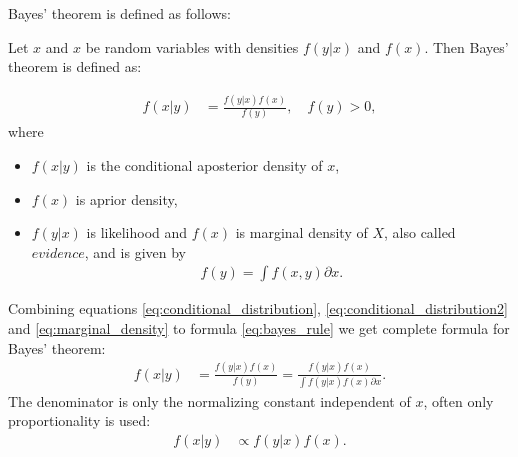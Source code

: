 Bayes' theorem is defined as follows:
    \begin{definition}
    Let $x$ and $x$ be random variables with densities $f(y|x)$ and $f(x)$. Then Bayes' theorem is defined as:
    \end{definition}
    \begin{align}
        f(x|y) &= \frac{f(y|x) f(x)}{f(y)}, \quad f(y) > 0,\label{eq:bayes_rule}
    \end{align}
where 
    \begin{itemize}
        \item $f(x|y) $ is the conditional aposterior density of $x$,
        \item $f(x)$ is aprior density, 
        \item  $f(y|x)$ is likelihood and $f(x)$ is marginal density of $X$, also called $evidence$, and is given by 
            \begin{align}
            f(y) = \int f(x,y) \partial x \label{eq:marginal_density}.
            \end{align}
    \end{itemize}
    
Combining equations \ref{eq:conditional_distribution}, \ref{eq:conditional_distribution2} and \ref{eq:marginal_density} to formula \ref{eq:bayes_rule} we get complete formula for Bayes' theorem:
    \begin{align}
        f(x|y) &= \frac{f(y|x) f(x)}{f(y)} = \frac{f(y|x) f(x)}{\int f(y|x) f(x) \partial x}. \label{eq:bayes_full}
    \end{align}
The denominator is only the normalizing constant independent of $x$, often only proportionality is used:
    \begin{align}
        f(x|y) &\propto f(y|x)f(x).
    \end{align}











    
